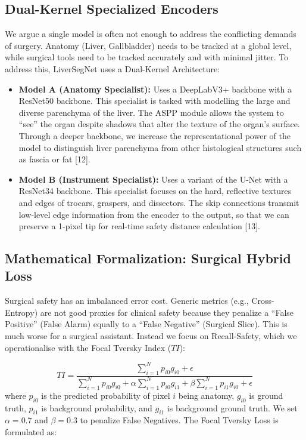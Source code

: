 \documentclass[conference]{IEEEtran}
\begin{document}
\subsection{Dual-Kernel Specialized Encoders}
We argue a single model is often not enough to address the conflicting demands of surgery. Anatomy (Liver, Gallbladder) needs to be tracked at a global level, while surgical tools need to be tracked accurately and with minimal jitter. To address this, LiverSegNet uses a Dual-Kernel Architecture:
\begin{itemize}
    \item \textbf{Model A (Anatomy Specialist):} Uses a DeepLabV3+ backbone with a ResNet50 backbone. This specialist is tasked with modelling the large and diverse parenchyma of the liver. The ASPP module allows the system to ``see'' the organ despite shadows that alter the texture of the organ's surface. Through a deeper backbone, we increase the representational power of the model to distinguish liver parenchyma from other histological structures such as fascia or fat [12].
    \item \textbf{Model B (Instrument Specialist):} Uses a variant of the U-Net with a ResNet34 backbone. This specialist focuses on the hard, reflective textures and edges of trocars, graspers, and dissectors. The skip connections transmit low-level edge information from the encoder to the output, so that we can preserve a 1-pixel tip for real-time safety distance calculation [13].
\end{itemize}

\subsection{Mathematical Formalization: Surgical Hybrid Loss}
Surgical safety has an imbalanced error cost. Generic metrics (e.g., Cross-Entropy) are not good proxies for clinical safety because they penalize a ``False Positive'' (False Alarm) equally to a ``False Negative'' (Surgical Slice). This is much worse for a surgical assistant. Instead we focus on Recall-Safety, which we operationalise with the Focal Tversky Index ($TI$):

\begin{equation}
TI = \frac{\sum_{i=1}^N p_{i0} g_{i0} + \epsilon}{\sum_{i=1}^N p_{i0} g_{i0} + \alpha \sum_{i=1}^N p_{i0} g_{i1} + \beta \sum_{i=1}^N p_{i1} g_{i0} + \epsilon}
\end{equation}
where $p_{i0}$ is the predicted probability of pixel $i$ being anatomy, $g_{i0}$ is ground truth, $p_{i1}$ is background probability, and $g_{i1}$ is background ground truth. We set $\alpha = 0.7$ and $\beta = 0.3$ to penalize False Negatives. The Focal Tversky Loss is formulated as:
\end{document}

